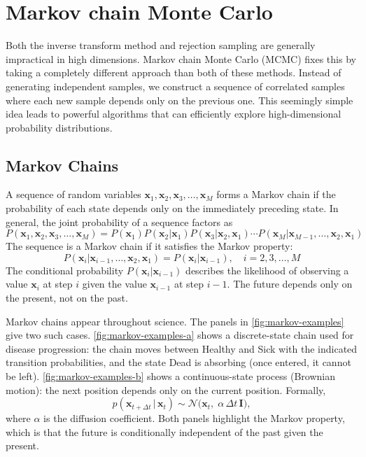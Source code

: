 \section{Markov chain Monte Carlo}

Both the inverse transform method and rejection sampling are generally impractical in high dimensions. Markov chain Monte Carlo (MCMC) fixes this by taking a completely different approach than both of these methods. Instead of generating independent samples, we construct a sequence of correlated samples where each new sample depends only on the previous one. This seemingly simple idea leads to powerful algorithms that can efficiently explore high-dimensional probability distributions.

\subsection{Markov Chains}
A sequence of random variables $\mathbf{x}_1, \mathbf{x}_2, \mathbf{x}_3, \ldots, \mathbf{x}_M$ forms a Markov chain if the probability of each state depends only on the immediately preceding state. In general, the joint probability of a sequence factors as
\begin{equation}
    P(\mathbf{x}_1, \mathbf{x}_2, \mathbf{x}_3, \ldots, \mathbf{x}_M) = P(\mathbf{x}_1) P(\mathbf{x}_2|\mathbf{x}_1) P(\mathbf{x}_3|\mathbf{x}_2, \mathbf{x}_1) \cdots P(\mathbf{x}_M|\mathbf{x}_{M-1}, \ldots, \mathbf{x}_2, \mathbf{x}_1)
\end{equation}
The sequence is a Markov chain if it satisfies the Markov property:
\begin{equation}
    P(\mathbf{x}_i|\mathbf{x}_{i-1}, \ldots, \mathbf{x}_2, \mathbf{x}_1) = P(\mathbf{x}_i|\mathbf{x}_{i-1}), \quad i = 2, 3, \ldots, M
\end{equation}
The conditional probability $P(\mathbf{x}_i|\mathbf{x}_{i-1})$ describes the likelihood of observing a value $\mathbf{x}_i$ at step $i$ given the value $\mathbf{x}_{i-1}$ at step $i-1$. The future depends only on the present, not on the past.

Markov chains appear throughout science. The panels in \autoref{fig:markov-examples} give two such cases. \autoref{fig:markov-examples-a} shows a discrete-state chain used for disease progression: the chain moves between Healthy and Sick with the indicated transition probabilities, and the state Dead is absorbing (once entered, it cannot be left). \autoref{fig:markov-examples-b} shows a continuous-state process (Brownian motion): the next position depends only on the current position. Formally,
\begin{equation}
    p(\mathbf{x}_{t+\Delta t}\,|\,\mathbf{x}_t) \sim \mathcal{N}\!\big(\mathbf{x}_t,\; \alpha\, \Delta t\, \mathbf{I}\big),
\end{equation}
where $\alpha$ is the diffusion coefficient. Both panels highlight the Markov property, which is that the future is conditionally independent of the past given the present.

